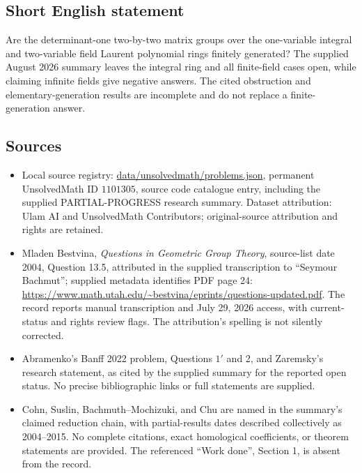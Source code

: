 \documentclass[11pt]{article}
\begin{document}
\subsection{Short English statement}
Are the determinant-one two-by-two matrix groups over the one-variable integral and two-variable field Laurent polynomial rings finitely generated? The supplied August 2026 summary leaves the integral ring and all finite-field cases open, while claiming infinite fields give negative answers. The cited obstruction and elementary-generation results are incomplete and do not replace a finite-generation answer.
\subsection{Sources}
\begin{itemize}
\item Local source registry: \url{data/unsolvedmath/problems.json}, permanent UnsolvedMath ID $1101305$, source code catalogue entry, including the supplied PARTIAL-PROGRESS research summary. Dataset attribution: Ulam AI and UnsolvedMath Contributors; original-source attribution and rights are retained.
\item Mladen Bestvina, \emph{Questions in Geometric Group Theory}, source-list date 2004, Question 13.5, attributed in the supplied transcription to ``Seymour Bachmut''; supplied metadata identifies PDF page 24: \url{https://www.math.utah.edu/~bestvina/eprints/questions-updated.pdf}. The record reports manual transcription and July 29, 2026 access, with current-status and rights review flags. The attribution's spelling is not silently corrected.
\item Abramenko's Banff 2022 problem, Questions $1'$ and 2, and Zaremsky's research statement, as cited by the supplied summary for the reported open status. No precise bibliographic links or full statements are supplied.
\item Cohn, Suslin, Bachmuth--Mochizuki, and Chu are named in the summary's claimed reduction chain, with partial-results dates described collectively as 2004--2015. No complete citations, exact homological coefficients, or theorem statements are provided. The referenced ``Work done'', Section 1, is absent from the record.
\end{itemize}
\end{document}
